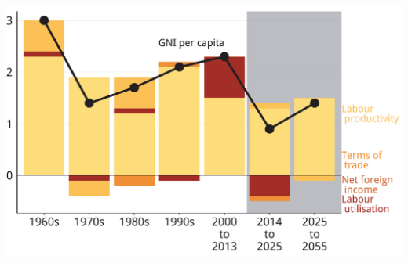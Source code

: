 \documentclass[tikz]{standalone}\usepackage[]{graphicx}\usepackage[]{color}
\newenvironment{knitrout}{}{} %
\begin{document}
\begin{knitrout}
\color{fgcolor}
\includegraphics[width=11.000in,height=7.00in]{./b5-figure/FISCAL-Figure5-1} 

\end{knitrout}
\end{document}
